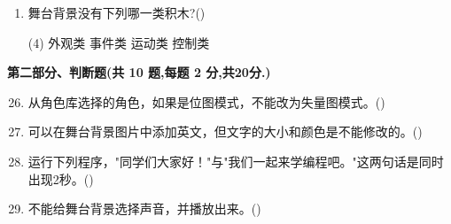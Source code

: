 \documentclass[10pt, a4paper]{article}
\begin{document}
\begin{enumerate}
        \item 舞台背景没有下列哪一类积木?(\qquad)
        \begin{tasks}(4)
            \task 外观类
            \task 事件类
            \task 运动类
            \task 控制类
        \end{tasks}
    \end{enumerate}

    \newpage
    {\noindent\textbf{第二部分、判断题(共 10 题,每题 2 分,共20分.)}}
    \begin{enumerate}
        \setcounter{enumi}{25}
        \item 从角色库选择的角色，如果是位图模式，不能改为失量图模式。(\qquad)

        \item 可以在舞台背景图片中添加英文，但文字的大小和颜色是不能修改的。(\qquad)

        \item 运行下列程序，"同学们大家好！"与"我们一起来学编程吧。"这两句话是同时出现2秒。(\qquad)

        \item 不能给舞台背景选择声音，并播放出来。(\qquad)


\end{enumerate}
\end{document}

